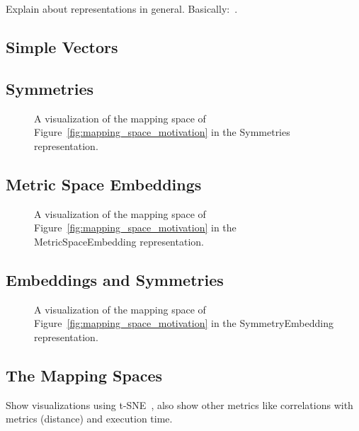 Explain about representations in general. Basically:~\cite{goens_mcsoc18}.
\subsection{Simple Vectors}

\subsection{Symmetries}

\begin{figure}[h]
	\centering
  \resizebox{0.55\textwidth}{!}{
    \begin{tikzpicture}[x=1pt,y=1pt]
      
    \end{tikzpicture}
    }
	\caption{A visualization of the mapping space of Figure~\ref{fig:mapping_space_motivation} in the Symmetries representation.}
	\label{fig:example_space_symmetries}
\end{figure}
\subsection{Metric Space Embeddings}
\begin{figure}[h]
	\centering
  \resizebox{0.55\textwidth}{!}{
    \begin{tikzpicture}[x=1pt,y=1pt]
      
    \end{tikzpicture}
  }
	\caption{A visualization of the mapping space of Figure~\ref{fig:mapping_space_motivation} in the MetricSpaceEmbedding representation.}
	\label{fig:example_space_embedding}
\end{figure}
\subsection{Embeddings and Symmetries}
\begin{figure}[h]
	\centering
  \resizebox{0.55\textwidth}{!}{
    \begin{tikzpicture}[x=1pt,y=1pt]
    
    \end{tikzpicture}
  }
	\caption{A visualization of the mapping space of Figure~\ref{fig:mapping_space_motivation} in the SymmetryEmbedding representation.}
	\label{fig:example_space_symmetries_embedding}
\end{figure}

\subsection{The Mapping Spaces}
Show visualizations using t-SNE~\cite{tsne}, also show other metrics like
correlations with metrics (distance) and execution time.


